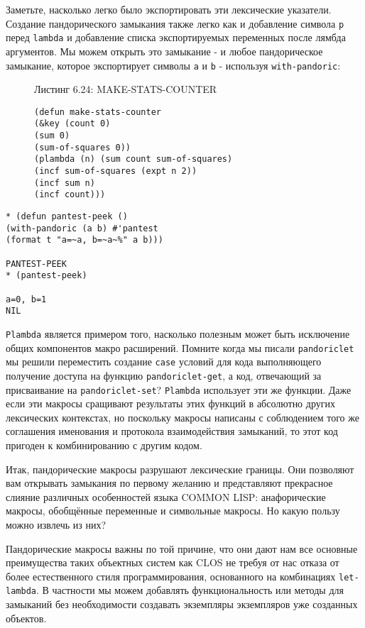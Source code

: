 Заметьте, насколько легко было экспортировать эти лексические указатели. Создание пандорического замыкания также легко как и добавление символа \verb"p" перед \verb"lambda" и добавление списка экспортируемых переменных после лямбда аргументов. Мы можем открыть это замыкание - и любое пандорическое замыкание, которое экспортирует символы \verb"a" и \verb"b" - используя \verb"with-pandoric":

\begin{figure}Листинг 6.24: MAKE-STATS-COUNTER\label{listing_6.24}
\listbegin
\begin{verbatim}
(defun make-stats-counter
(&key (count 0)
(sum 0)
(sum-of-squares 0))
(plambda (n) (sum count sum-of-squares)
(incf sum-of-squares (expt n 2))
(incf sum n)
(incf count)))
\end{verbatim}
\listend
\end{figure}

\begin{verbatim}
* (defun pantest-peek ()
(with-pandoric (a b) #'pantest
(format t "a=~a, b=~a~%" a b)))

PANTEST-PEEK
* (pantest-peek)

a=0, b=1
NIL
\end{verbatim}

\verb"Plambda" является примером того, насколько полезным может быть исключение общих компонентов макро расширений. Помните когда мы писали \verb"pandoriclet" мы решили переместить создание \verb"case" условий для кода выполняющего получение доступа на функцию \verb"pandoriclet-get", а код, отвечающий за присваивание на \verb"pandoriclet-set"? \verb"Plambda" использует эти же функции. Даже если эти макросы сращивают результаты этих функций в абсолютно других лексических контекстах, но поскольку макросы написаны с соблюдением того же соглашения именования и протокола взаимодействия замыканий, то этот код пригоден к комбинированию с другим кодом.

Итак, пандорические макросы разрушают лексические границы. Они позволяют вам открывать замыкания по первому желанию и представляют прекрасное слияние различных особенностей языка COMMON LISP: анафорические макросы, обобщённые переменные и символьные макросы. Но какую пользу можно извлечь из них?

Пандорические макросы важны по той причине, что они дают нам все основные преимущества таких объектных систем как CLOS не требуя от нас отказа от более естественного стиля программирования, основанного на комбинациях \verb"let-lambda". В частности мы можем добавлять функциональность или методы для замыканий без необходимости создавать экземпляры экземпляров уже созданных объектов.

